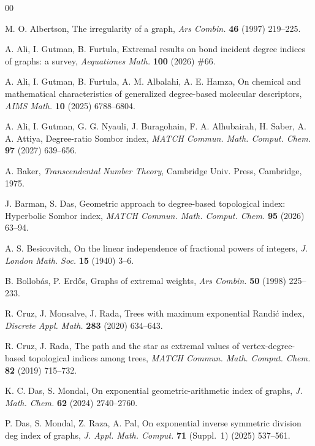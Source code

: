 \documentclass[a5paper, 10pt]{article}
\theoremstyle{plain}
\theoremstyle{remark}
\theoremstyle{definition}
\begin{document}
 \begin{thebibliography}{00}

   M. O. Albertson, The irregularity of a graph,
  \textit{Ars Combin.\/} \textbf{46} (1997) 219--225.

   A. Ali, I. Gutman, B. Furtula,
  Extremal results on bond incident degree indices of graphs: a survey,
  \textit{Aequationes Math.\/} \textbf{100} (2026) \#66.

   A. Ali, I. Gutman,
  B. Furtula, A. M. Albalahi, A. E. Hamza, On chemical and mathematical
  characteristics of generalized degree-based molecular descriptors,
  \textit{AIMS Math.\/} \textbf{10} (2025) 6788--6804.

   A. Ali, I. Gutman, G. G. Nyauli, J. Buragohain,
  F. A. Alhubairah, H. Saber, A. A. Attiya, Degree-ratio Sombor index,
  \textit{MATCH Commun. Math. Comput. Chem.\/} \textbf{97} (2027) 639--656.

   A. Baker, \textit{Transcendental Number Theory\/},
  Cambridge Univ. Press, Cambridge, 1975.

   J. Barman, S. Das, Geometric approach to
  degree-based topological index: Hyperbolic Sombor index, \textit{MATCH
  Commun. Math. Comput. Chem.\/} \textbf{95} (2026) 63--94.

   A. S. Besicovitch, On the linear independence
  of fractional powers of integers, \textit{J. London Math. Soc.\/}
  \textbf{15} (1940) 3--6.

  B. Bollob\'as, P. Erd\H{o}s, Graphs of extremal weights, \textit{Ars Combin.\/}
  \textbf{50} (1998) 225--233.

   R. Cruz, J. Monsalve, J. Rada, Trees with
  maximum exponential Randi\'c index, \textit{Discrete Appl. Math.\/}
  \textbf{283} (2020) 634--643.

   R. Cruz, J. Rada, The path and the star as
  extremal values of vertex-degree-based topological indices among trees,
  \textit{MATCH Commun. Math. Comput. Chem.\/} \textbf{82} (2019) 715--732.

   K. C. Das, S. Mondal, On exponential
  geometric-arithmetic index of graphs, \textit{J. Math. Chem.\/}
  \textbf{62} (2024) 2740--2760.

   P. Das, S. Mondal, Z. Raza,
  A. Pal, On exponential inverse symmetric division deg index of graphs,
  \textit{J. Appl. Math. Comput.\/} \textbf{71} (Suppl.~1) (2025) 537--561.


\end{thebibliography}
\end{document}
